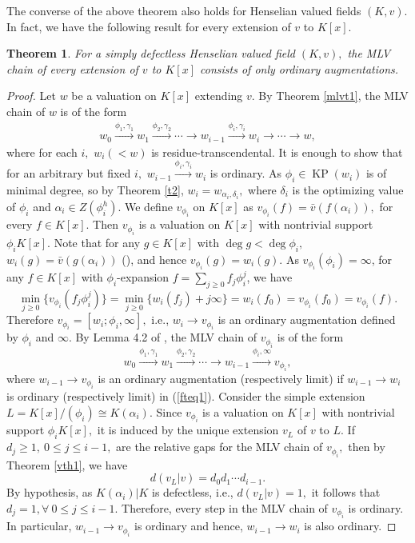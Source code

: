 \documentclass[11pt]{amsart}
\newtheorem{theorem}{Theorem}[section]
\theoremstyle{definition}
\theoremstyle{remark}
\numberwithin{equation}{section}
\begin{document}
	The converse of the above theorem also holds for Henselian valued fields $(K,v).$ In fact, we have the following result for every extension of $v$ to $K[x].$
	\begin{theorem}\label{depth}
		For a simply defectless Henselian valued field $(K,v),$ the MLV chain of every extension of $v$ to $K[x]$ consists of only ordinary augmentations.
	\end{theorem}
		\begin{proof}
	 Let $w$ be a valuation on $K[x]$ extending $v.$ By Theorem \ref{mlvt1}, the MLV chain of $w$ is of the form
		\begin{align}\label{fteq1}
			w_0  \xrightarrow{\phi_1,\gamma_1} w_1  \xrightarrow{\phi_2,\gamma_2} \cdots  \longrightarrow w_{i-1}  \xrightarrow{\phi_i,\gamma_i} w_i  \longrightarrow\cdots \longrightarrow w,	
		\end{align}
		where for each $i,$ $w_i(<w)$ is residue-transcendental. It is enough to show that for an arbitrary but fixed $i,$ $w_{i-1}  \xrightarrow{\phi_i,\gamma_i} w_i$ is ordinary. As $\phi_i \in \operatorname{KP}(w_i)$ is of minimal degree, so by Theorem \ref{t2}, $w_i=w_{\alpha_i,\delta_i},$ where $\delta_i$ is the optimizing value of $\phi_i$ and $\alpha_i \in Z(\phi_i^h)$. We define $v_{\phi_i}$ on $K[x]$ as $v_{\phi_i}(f)=\bar{v}(f(\alpha_i)),$ for every $f\in K[x].$ Then $v_{\phi_i}$ is a valuation on $K[x]$ with nontrivial support $\phi_iK[x].$ Note that for any $g\in K[x]$ with $\deg g<\deg \phi_i,$ $w_i(g)=\bar{v}(g(\alpha_i))$ (\cite[Lemma 3.6]{W}), and hence $v_{\phi_i}(g)= w_i(g).$ As $v_{\phi_i}(\phi_i)=\infty$, for any $f\in K[x]$ with $\phi_i$-expansion $f=\sum_{j\geq 0}f_j \phi_i^j$,  we have \[\min_{j\geq 0}\{v_{\phi_i}(f_j\phi_i^j)\}=\min_{j\geq 0}\{w_i(f_j)+j\infty\}=w_i(f_0)=v_{\phi_i}(f_0)=v_{\phi_i}(f).\] Therefore $v_{\phi_i} =[w_i; \phi_i,\infty],$ i.e., $w_i\longrightarrow v_{\phi_i}$ is an ordinary augmentation defined by $\phi_i$ and $\infty.$ By Lemma 4.2 of \cite{EN1}, the MLV chain of $v_{\phi_i}$ is of the form 
		\[ w_0  \xrightarrow{\phi_1,\gamma_1} w_1  \xrightarrow{\phi_2,\gamma_2} \cdots  \longrightarrow w_{i-1}  \xrightarrow{\phi_i,\infty} v_{\phi_i},\] where $w_{i-1}\longrightarrow v_{\phi_i}$ is an ordinary augmentation (respectively limit) if $w_{i-1}\longrightarrow w_i$ is ordinary (respectively limit) in (\ref{fteq1}). Consider the simple extension $L=K[x]/(\phi_i) \cong K(\alpha_i).$ Since $v_{\phi_i}$ is a valuation on $K[x]$ with nontrivial support $\phi_i K[x],$ it is induced by the unique extension $v_L$ of $v$ to $L.$ If $d_j\geq1,\ 0\leq j\leq i-1,$ are the relative gaps for the MLV chain of $v_{\phi_i},$ then by Theorem \ref{vth1}, we have
		\[d(v_L|v)=d_0d_1\cdots d_{i-1}.\]
		By hypothesis, as $K(\alpha_i)|K$ is defectless, i.e., $d(v_L|v)=1,$ it follows that $d_j=1, \forall \ 0\leq j\leq i-1.$ Therefore, every step in the MLV chain of $v_{\phi_i}$ is ordinary. In particular, $ w_{i-1}\longrightarrow v_{\phi_i}$ is ordinary and hence, $w_{i-1}\longrightarrow w_i$ is also ordinary.
			\end{proof}
\end{document}
